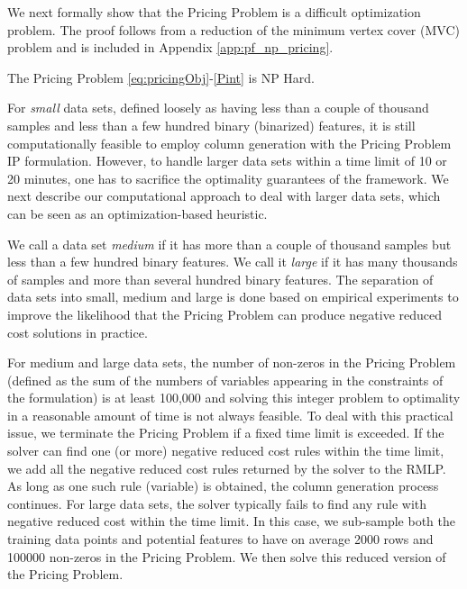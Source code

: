 \documentclass[twoside,11pt]{article}
\begin{document}

We next formally show that the Pricing Problem is a difficult optimization problem. The proof follows from a reduction of the minimum vertex cover (MVC) problem and is included in Appendix \ref{app:pf_np_pricing}.

\begin{theorem} \label{theorem:np_pricing}
The Pricing Problem \eqref{eq:pricingObj}-\eqref{Pint} is NP Hard.		
\end{theorem}

 For {\em small} data sets, defined loosely as having less than a couple of thousand samples and less than a few hundred %
binary (binarized) features, it is still computationally feasible to employ column generation with the Pricing Problem IP formulation. However, to handle larger data sets within a time limit of 10 or 20 minutes, one has to sacrifice the optimality guarantees of the framework. We next describe our computational approach to deal with larger data sets, which can be seen as an optimization-based heuristic. 

We call a data set {\em medium} if it has more than a couple of thousand samples but less than a few hundred binary features. We call it {\em large} if it has many thousands of samples and more than several hundred binary features. The separation of data sets into small, medium and large is done based on empirical experiments to improve the likelihood that the Pricing Problem can produce negative reduced cost solutions in practice.

For medium and large data sets, the number of non-zeros in the Pricing Problem (defined as the sum of the numbers of variables appearing in the constraints of the formulation) is at least 100,000 and solving this  integer problem to optimality in a reasonable amount of time is not always feasible. To deal with this practical issue, we terminate the  Pricing Problem if a fixed time limit is exceeded. 
If the solver can find one (or more) negative reduced cost rules within the time limit, we add all the negative reduced cost rules returned by the solver to the RMLP. As long as one such rule (variable) is obtained, the column generation process continues. For large data sets, the solver typically fails to find any rule with negative reduced cost within the time limit. In this case,  we sub-sample both the training data points and potential features to have on average 2000 rows and 100000 non-zeros in the Pricing Problem. We then solve this reduced version of the Pricing Problem.
\end{document}
